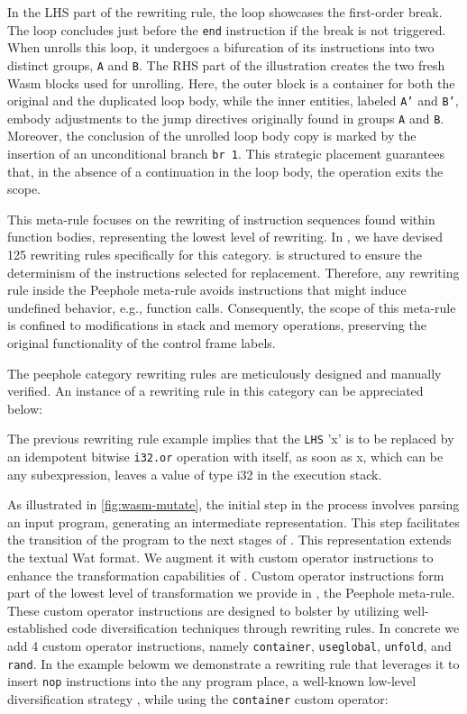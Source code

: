 In the LHS part of the rewriting rule, the loop showcases the first-order break.
The loop concludes just before the \texttt{end} instruction if the break is not triggered.
When \tool unrolls this loop, it undergoes a bifurcation of its instructions into two distinct groups, \texttt{A} and \texttt{B}. 
The RHS part of the illustration creates the two fresh Wasm blocks used for unrolling. 
Here, the outer block is a container for both the original and the duplicated loop body, while the inner entities, labeled \texttt{A'} and \texttt{B'}, embody adjustments to the jump directives originally found in groups \texttt{A} and \texttt{B}.
Moreover, the conclusion of the unrolled loop body copy is marked by the insertion of an unconditional branch \texttt{br 1}. 
This strategic placement guarantees that, in the absence of a continuation in the loop body, the operation exits the scope.


This meta-rule focuses on the rewriting of instruction sequences found within function bodies, representing the lowest level of rewriting. 
In \tool, we have devised 125 rewriting rules specifically for this category.
\tool is structured to ensure the determinism of the instructions selected for replacement.
Therefore, any rewriting rule inside the Peephole meta-rule avoids instructions that might induce undefined behavior, e.g., function calls.
Consequently, the scope of this meta-rule is confined to modifications in stack and memory operations, preserving the original functionality of the control frame labels.

The peephole category rewriting rules are meticulously designed and manually verified. 
An instance of a rewriting rule in this category can be appreciated below:



The previous rewriting rule example implies that the \texttt{LHS} 'x' is to be replaced by an idempotent bitwise \texttt{i32.or} operation with itself,  as soon as x, which can be any subexpression, leaves a value of type i32 in the execution stack.


As illustrated in \autoref{fig:wasm-mutate}, the initial step in the process involves parsing an input \Wasm program, generating an intermediate representation. 
This step facilitates the transition of the \Wasm program to the next stages of \tool. 
This representation extends the textual Wat format.
We augment it with custom operator instructions to enhance the transformation capabilities of \tool.
Custom operator instructions form part of the lowest level of transformation we provide in \tool, the Peephole meta-rule.
These custom operator instructions are designed to bolster \tool by utilizing well-established code diversification techniques through rewriting rules.
In concrete we add 4 custom operator instructions, namely \texttt{container}, \texttt{useglobal}, \texttt{unfold}, and \texttt{rand}.
In the example belowm we demonstrate a rewriting rule that leverages it to insert \texttt{nop} instructions into the any \Wasm program place, a well-known low-level diversification strategy \cite{nop}, while using the \texttt{container} custom operator:

